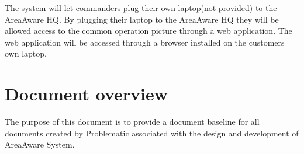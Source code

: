 The system will let commanders plug their own laptop(not provided) to the AreaAware HQ.
By plugging their laptop to the AreaAware HQ they will be allowed access to the common operation picture through a web application. 
The web application will be accessed through a browser installed on the customers own laptop.


\section{Document overview}
The purpose of this document is to provide a document baseline for all documents created by Problematic associated with the design and development of AreaAware System.

%
